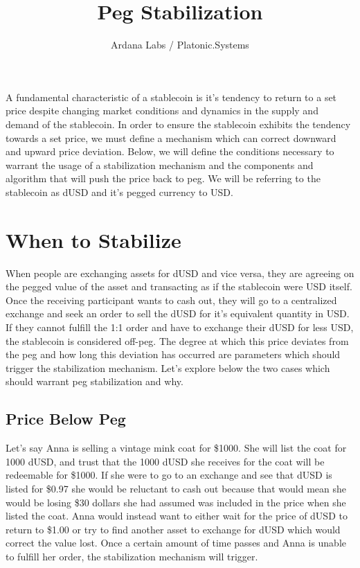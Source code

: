 \documentclass[12pt]{article}
\title{Peg Stabilization}
\author{Ardana Labs / Platonic.Systems}
\begin{document}
\maketitle

A fundamental characteristic of a stablecoin is it's tendency to return to a set price despite changing market conditions and dynamics in the supply and demand of the stablecoin. In order to ensure the stablecoin exhibits the tendency towards a set price, we must define a mechanism which can correct downward and upward price deviation. Below, we will define the conditions necessary to warrant the usage of a stabilization mechanism and the components and algorithm that will push the price back to peg. We will be referring to the stablecoin as dUSD and it's pegged currency to USD.

\section{When to Stabilize}

When people are exchanging assets for dUSD and vice versa, they are agreeing on the pegged value of the asset and transacting as if the stablecoin were USD itself. Once the receiving participant wants to cash out, they will go to a centralized exchange and seek an order to sell the dUSD for it's equivalent quantity in USD. If they cannot fulfill the 1:1 order and have to exchange their dUSD for less USD, the stablecoin is considered off-peg. The degree at which this price deviates from the peg and how long this deviation has occurred are parameters which should trigger the stabilization mechanism. Let's explore below the two cases which should warrant peg stabilization and why.  

\subsection{Price Below Peg}

Let's say Anna is selling a vintage mink coat for \$1000. She will list the coat for 1000 dUSD, and trust that the 1000 dUSD she receives for the coat will be redeemable for \$1000. If she were to go to an exchange and see that dUSD is listed for \$0.97 she would be reluctant to cash out because that would mean she would be losing \$30 dollars she had assumed was included in the price when she listed the coat. Anna would instead want to either wait for the price of dUSD to return to \$1.00 or try to find another asset to exchange for dUSD which would correct the value lost. Once a certain amount of time passes and Anna is unable to fulfill her order, the stabilization mechanism will trigger.
\end{document}
